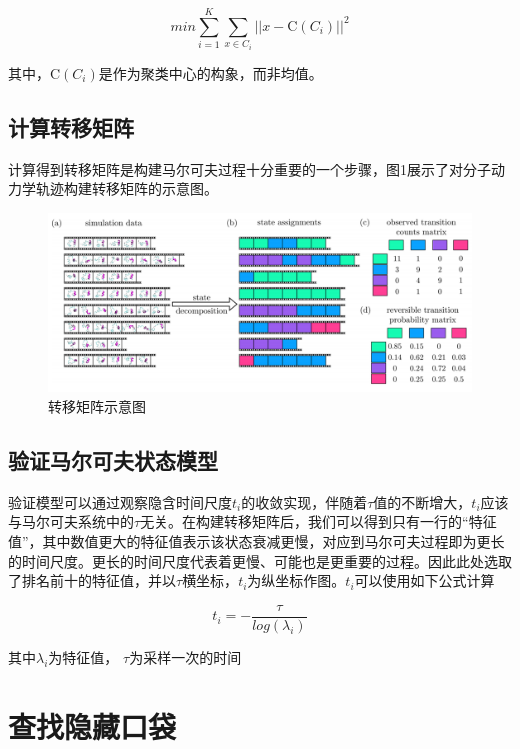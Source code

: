 \documentclass[a4paper]{article}
\begin{document}
\begin{CJK}{UTF8}{gbsn}
\begin{equation}
min\sum_{i=1}^{K}\sum_{x\in C_{i}}^{} {\vert\vert x- \mathrm C(C_{i}) \vert\vert}^{2}
\end{equation}


其中，$\mathrm C(C_{i})$是作为聚类中心的构象，而非均值。


	\subsection{计算转移矩阵}
计算得到转移矩阵是构建马尔可夫过程十分重要的一个步骤，图1展示了对分子动力学轨迹构建转移矩阵的示意图。

\begin{figure}[H]
\centering
\includegraphics[scale=0.35]{trans_matrix.png}
\caption{转移矩阵示意图}
\end{figure}



	\subsection{验证马尔可夫状态模型}

验证模型可以通过观察隐含时间尺度$t_{i}$的收敛实现，伴随着$\tau$值的不断增大，$t_{i}$应该与马尔可夫系统中的$\tau$无关。在构建转移矩阵后，我们可以得到只有一行的“特征值”，其中数值更大的特征值表示该状态衰减更慢，对应到马尔可夫过程即为更长的时间尺度。更长的时间尺度代表着更慢、可能也是更重要的过程。因此此处选取了排名前十的特征值，并以$\tau$横坐标，$t_{i}$为纵坐标作图。$t_{i}$可以使用如下公式计算


\begin{equation}
t_{i} = -\frac{\tau}{log(\lambda_{i})}
\end{equation}

其中$\lambda_{i}$为特征值， $\tau$为采样一次的时间





\section{查找隐藏口袋}

\end{CJK}
\end{document}

